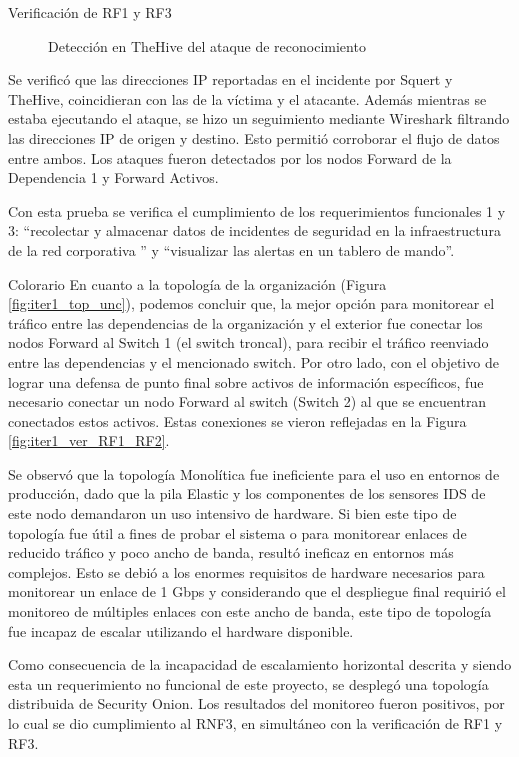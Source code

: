 \begin{section}{Verificación de RF1 y RF3}
\begin{figure}[H]
    \caption{Detección en TheHive del ataque de reconocimiento}
    \label{fig:thehive-nmap}
    \end{figure}
    \FloatBarrier
    Se verificó que las direcciones IP reportadas en el incidente por Squert y TheHive, coincidieran con las de la víctima y el atacante. Además mientras se estaba ejecutando el ataque, se hizo un seguimiento mediante Wireshark \cite{wireshark} filtrando las direcciones IP de origen y destino. Esto permitió corroborar el flujo de datos entre ambos.
    Los ataques fueron detectados por los nodos Forward de la Dependencia 1 y Forward Activos. \par
    Con esta prueba se verifica el cumplimiento de los requerimientos funcionales 1 y 3: “recolectar y almacenar datos de incidentes de seguridad en la infraestructura de la red corporativa ” y “visualizar las alertas en un tablero de mando”.\par
    \end{section} 
    
    
    \begin{section}{Colorario}
    En cuanto a la topología de la organización (Figura \ref{fig:iter1_top_unc}), podemos concluir que, la mejor opción para monitorear el tráfico entre las dependencias de la organización y el exterior fue conectar los nodos Forward al Switch 1 (el switch troncal), para recibir el tráfico reenviado entre las dependencias y el mencionado switch. Por otro lado, con el objetivo de lograr una defensa de punto final sobre activos de información específicos, fue necesario conectar un nodo Forward al switch (Switch 2) al que se encuentran conectados estos activos. Estas conexiones se vieron reflejadas en la Figura \ref{fig:iter1_ver_RF1_RF2}. \par
    Se observó que la topología Monolítica fue ineficiente para el uso en entornos de producción, dado que la pila Elastic y los componentes de los sensores IDS de este nodo demandaron un uso intensivo de hardware. Si bien este tipo de topología fue útil a fines de probar el sistema o para monitorear enlaces de reducido tráfico y poco ancho de banda, resultó ineficaz en entornos más complejos. Esto se debió a los enormes requisitos de hardware necesarios para monitorear un enlace de 1 Gbps y considerando que el despliegue final requirió el monitoreo de múltiples enlaces con este ancho de banda, este tipo de topología fue incapaz de escalar utilizando el hardware disponible.\par
    Como consecuencia de la incapacidad de escalamiento horizontal descrita y siendo esta un requerimiento no funcional de este proyecto, se desplegó una topología distribuida de Security Onion. Los resultados del monitoreo fueron positivos, por lo cual se dio cumplimiento al RNF3, en simultáneo con la verificación de RF1 y RF3.\par
    

    \end{section}